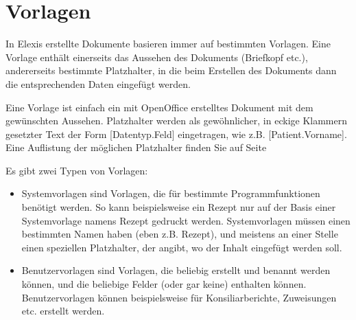 

 \section{Vorlagen}
 \label{textvorlagen}
In Elexis erstellte Dokumente basieren immer auf bestimmten Vorlagen. Eine
Vorlage enthält einerseits das Aussehen des Dokuments (Briefkopf etc.),
andererseits bestimmte Platzhalter, in die beim Erstellen des Dokuments dann die
entsprechenden Daten eingefügt werden.

Eine Vorlage ist einfach ein mit OpenOffice erstelltes Dokument mit dem
gewünschten Aussehen. Platzhalter werden als gewöhnlicher, in eckige Klammern
gesetzter Text der Form [Datentyp.Feld] eingetragen, wie z.B.
[Patient.Vorname]. Eine Auflistung der möglichen Platzhalter finden Sie auf
Seite \pageref{Platzhalter}

Es gibt zwei Typen von Vorlagen:
\begin{itemize}
  \item {Systemvorlagen} sind Vorlagen, die für bestimmte Programmfunktionen
  benötigt werden. So kann beispielsweise ein Rezept nur auf der Basis einer
  Systemvorlage namens \glqq Rezept\grqq{} gedruckt werden. Systemvorlagen
  müssen einen bestimmten Namen haben (eben z.B. \glqq Rezept\grqq{}), und
  meistens an einer Stelle einen speziellen Platzhalter, der angibt, wo der
  Inhalt eingefügt werden soll.
  \item {Benutzervorlagen} sind Vorlagen, die beliebig erstellt und benannt
  werden können, und die beliebige Felder (oder gar keine) enthalten können.
  Benutzervorlagen können beispielsweise für Konsiliarberichte, Zuweisungen
  etc. erstellt werden.
\end{itemize}


